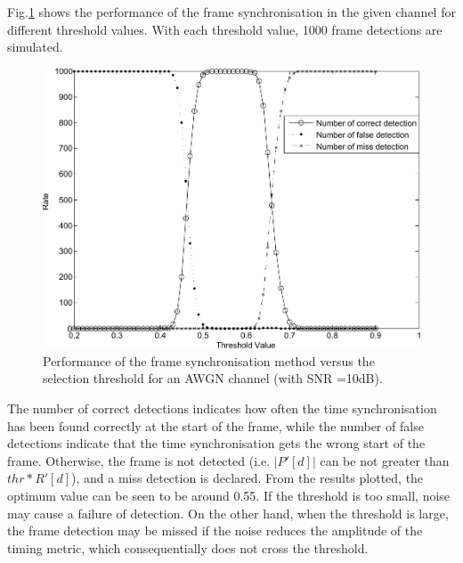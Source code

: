 Fig.\ref{fig:TimeSyn_thr_AWGN} shows the performance of the frame synchronisation in the given channel for different threshold values.
With each threshold value, 1000 frame detections are simulated.
\begin{figure}
	\centerline{\includegraphics [width=0.9\columnwidth] {figures/ThresholdEffect.pdf}}
	\caption{Performance of the frame synchronisation method versus the selection threshold for an AWGN channel (with SNR =10dB).}
	\label{fig:TimeSyn_thr_AWGN}
\end{figure}
The number of correct detections indicates how often the time synchronisation has been found correctly at the start of the frame, while the number of false detections indicate that the time synchronisation gets the wrong start of the frame.
Otherwise, the frame is not detected (i.e. $|P'[d]|$ can be not greater than $thr * R'[d]$), and a miss detection is declared.
From the results plotted,  the optimum value can be seen to be around 0.55.
If the threshold is too small, noise may cause a failure of detection.
On the other hand, when the threshold is large, the frame detection may be missed if the noise reduces the amplitude of the timing metric, which consequentially does not cross the threshold.


